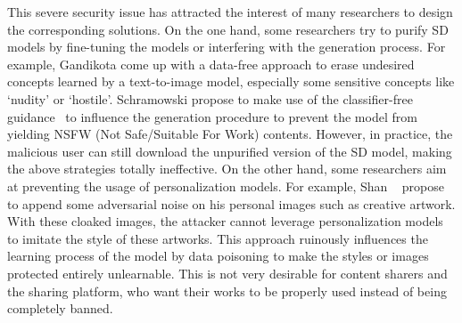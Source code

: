 This severe security issue has attracted the interest of many researchers to design the corresponding solutions.
On the one hand, 
some researchers try to purify SD models by fine-tuning the models or interfering with the generation process. For example, Gandikota \etal\cite{Erasing} come up with a data-free approach to erase undesired concepts learned by a text-to-image model, especially some sensitive concepts like `nudity' or `hostile'.  Schramowski \etal\cite{SLD} propose to make use of the classifier-free guidance~\cite{Classifierfreeguidiance} to influence the generation procedure to prevent the model from yielding NSFW (Not Safe/Suitable For Work) contents.
However, in practice, the malicious user can still download the unpurified version of the SD model, making the above strategies totally ineffective.
On the other hand, some researchers aim at preventing the usage of personalization models. For example, Shan \etal~\cite{GLAZE} propose to append some adversarial noise on his personal images such as creative artwork. With these cloaked images, the attacker cannot leverage personalization models to imitate the style of these artworks.
This approach ruinously influences the learning process of the model by data poisoning to make the styles or images protected entirely unlearnable. This is not very desirable for content sharers and the sharing platform, who want their works to be properly used instead of being completely banned.

